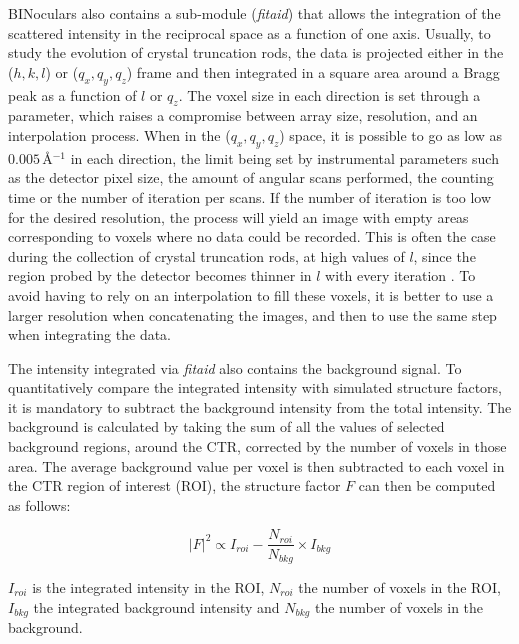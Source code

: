 BINoculars also contains a sub-module (\textit{fitaid}) that allows the integration of the scattered intensity in the reciprocal space as a function of one axis.
Usually, to study the evolution of crystal truncation rods, the data is projected either in the ($h, k, l$) or ($q_x, q_y, q_z$) frame and then integrated in a square area around a Bragg peak as a function of $l$ or $q_z$.
The voxel size in each direction is set through a parameter, which raises a compromise between array size, resolution, and an interpolation process.
When in the ($q_x, q_y, q_z$) space, it is possible to go as low as $0.005 \, \si{\angstrom^{-1}}$ in each direction, the limit being set by instrumental parameters such as the detector pixel size, the amount of angular scans performed, the counting time or the number of iteration per scans.
If the number of iteration is too low for the desired resolution, the process will yield an image with empty areas corresponding to voxels where no data could be recorded.
This is often the case during the collection of crystal truncation rods, at high values of $l$, since the region probed by the detector becomes thinner in $l$ with every iteration \parencite{Drnec2014}.
To avoid having to rely on an interpolation to fill these voxels, it is better to use a larger resolution when concatenating the images, and then to use the same step when integrating the data.

The intensity integrated via \textit{fitaid} also contains the background signal.
To quantitatively compare the integrated intensity with simulated structure factors, it is mandatory to subtract the background intensity from the total intensity.
The background is calculated by taking the sum of all the values of selected background regions, around the CTR, corrected by the number of voxels in those area.
The average background value per voxel is then subtracted to each voxel in the CTR region of interest (ROI), the structure factor $F$ can then be computed as follows:

\begin{equation}
    |F|^2 \propto I_{roi} - \frac{N_{roi}}{N_{bkg}} \times I_{bkg}
\end{equation}

$I_{roi}$ is the integrated intensity in the ROI, $N_{roi}$ the number of voxels in the ROI, $I_{bkg}$ the integrated background intensity and $N_{bkg}$ the number of voxels in the background.

